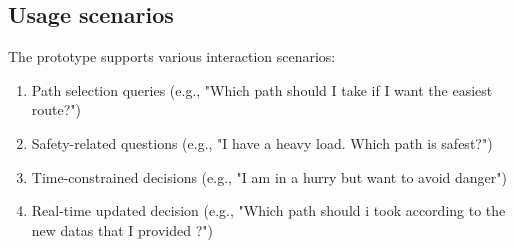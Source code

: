 \subsection{Usage scenarios}

The prototype supports various interaction scenarios:
\begin{enumerate}
    \item Path selection queries (e.g., "Which path should I take if I want the easiest route?")
    \item Safety-related questions (e.g., "I have a heavy load. Which path is safest?")
    \item Time-constrained decisions (e.g., "I am in a hurry but want to avoid danger")
    \item Real-time updated decision (e.g., "Which path should i took according to the new datas that I provided ?")
\end{enumerate}
